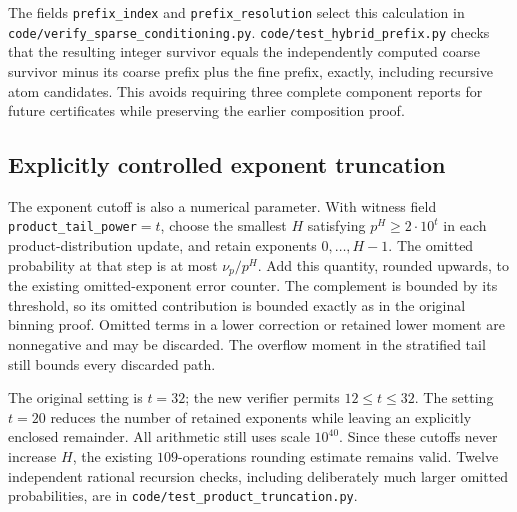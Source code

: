 \documentclass[11pt]{article}
\begin{document}
The fields \texttt{prefix\_index} and \texttt{prefix\_resolution} select
this calculation in \texttt{code/verify\_sparse\_conditioning.py}.
\texttt{code/test\_hybrid\_prefix.py} checks that the resulting integer
survivor equals the independently computed coarse survivor minus its
coarse prefix plus the fine prefix, exactly, including recursive atom
candidates. This avoids requiring three complete component reports for
future certificates while preserving the earlier composition proof.

\subsection{Explicitly controlled exponent truncation}
The exponent cutoff is also a numerical parameter. With witness field
\texttt{product\_tail\_power}$=t$, choose the smallest $H$ satisfying
$p^H\geq2\cdot10^t$ in each product-distribution update, and retain
exponents $0,\ldots,H-1$. The omitted probability at that step is at most
$\nu_p/p^H$. Add this quantity, rounded upwards, to the existing
omitted-exponent error counter. The complement is bounded by its threshold,
so its omitted contribution is bounded exactly as in the original
binning proof. Omitted terms in a lower correction or retained lower
moment are nonnegative and may be discarded. The overflow moment in the
stratified tail still bounds every discarded path.

The original setting is $t=32$; the new verifier permits $12\leq t\leq32$.
The setting $t=20$ reduces the number of retained exponents while leaving
an explicitly enclosed remainder. All arithmetic still uses scale $10^{40}$.
Since these cutoffs never increase $H$, the existing $109$-operations
rounding estimate remains valid. Twelve independent rational recursion
checks, including deliberately much larger omitted probabilities, are
in \texttt{code/test\_product\_truncation.py}.
\end{document}
